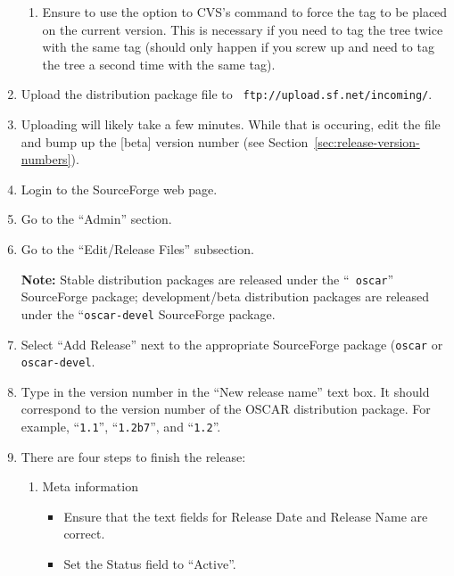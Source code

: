 \begin{enumerate}
\begin{enumerate}
  \item Ensure to use the  option to CVS's  command
    to force the tag to be placed on the current version.  This is
    necessary if you need to tag the tree twice with the same tag
    (should only happen if you screw up and need to tag the tree a
    second time with the same tag).
  \end{enumerate}

\item Upload the distribution package file to {\tt
    ftp://upload.sf.net/incoming/}.
  
\item Uploading will likely take a few minutes.  While that is
  occuring, edit the  file and bump up the [beta]
  version number (see Section~\ref{sec:release-version-numbers}).

\item Login to the SourceForge web page.

\item Go to the ``Admin'' section.

\item Go to the ``Edit/Release Files'' subsection.

{\bf Note:} Stable distribution packages are released under the ``{\tt
  oscar}'' SourceForge package; development/beta distribution packages
  are released under the ``{\tt oscar-devel} SourceForge package.

\item Select ``Add Release'' next to the appropriate SourceForge
  package ({\tt oscar} or {\tt oscar-devel}.

\item Type in the version number in the ``New release name'' text
  box.  It should correspond to the version number of the OSCAR
  distribution package.  For example, ``{\tt 1.1}'', ``{\tt 1.2b7}'',
  and ``{\tt 1.2}''.

\item There are four steps to finish the release:

  \begin{enumerate}

    \item Meta information
      \begin{itemize}
      \item Ensure that the text fields for Release Date and Release
        Name are correct.
        
      \item Set the Status field to ``Active''.
        

\end{itemize}
\end{enumerate}
\end{enumerate}
